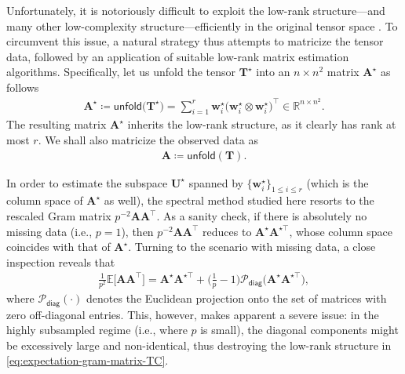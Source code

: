 Unfortunately, it is notoriously difficult to exploit the low-rank structure---and many other low-complexity structure---efficiently in the original tensor space \citep{hillar2013most}.
To circumvent this issue,
a natural strategy thus attempts to matricize the tensor data, followed by an application of suitable low-rank matrix estimation algorithms.   Specifically, let us unfold the tensor $\bm{T}^{\star}$ into an $n\times n^2$ matrix $\bm{A}^{\star}$ as follows
%
\begin{align}
	\bm{A}^{\star}\coloneqq \mathsf{unfold}\big( \bm{T}^{\star}\big)
	= \sum_{i=1}^{r}\bm{w}_{i}^{\star}\big(\bm{w}_{i}^{\star}\otimes\bm{w}_{i}^{\star}\big)^{\top} \in \mathbb{R}^{n\times n^2}.
	\label{eq:defn-Astar-TC}	
\end{align}
%
The resulting matrix $\bm{A}^{\star}$ inherits the low-rank structure, as it clearly has rank at most $r$. We shall also matricize the observed data as
%
\begin{align}
	\bm{A} \coloneqq \mathsf{unfold} ( \bm{T} ) .
	\label{eq:defn-A-TC}
\end{align}


In order to estimate the subspace $\bm{U}^{\star}$ spanned by $\{\bm{w}_i^{\star}\}_{1\leq i\leq r}$ (which is  the column space of $\bm{A}^{\star}$ as well), the spectral method studied here resorts to the rescaled Gram matrix $p^{-2} \bm{A} \bm{A}^{\top}$. As a sanity check, if there is absolutely no missing data (i.e., $p=1$), then $p^{-2} \bm{A} \bm{A}^{\top}$ reduces to $\bm{A}^{\star} \bm{A}^{\star\top}$, whose column space coincides with that of $\bm{A}^{\star}$.
Turning to the scenario with missing data, a close inspection reveals that
%
\begin{align}
	\frac{1}{p^{2}}\mathbb{E}\big[\bm{A}\bm{A}^{\top}\big]
	=  \bm{A}^{\star}\bm{A}^{\star\top}+ \Big(\frac{1}{p}-1\Big) \mathcal{P}_{\mathsf{diag}} \big(\bm{A}^{\star}\bm{A}^{\star\top}\big),
	\label{eq:expectation-gram-matrix-TC}
\end{align}
%
where $\mathcal{P}_{\mathsf{diag}} (\cdot)$ denotes the Euclidean projection onto the set of matrices with zero off-diagonal entries.
This, however, makes apparent a severe issue: in the highly subsampled regime (i.e., where $p$ is small), the diagonal components might be excessively large and non-identical, thus destroying the low-rank structure in  \eqref{eq:expectation-gram-matrix-TC}.


